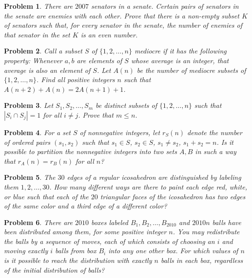 \documentclass[12pt]{article}
\newtheorem{problem}{Problem}
\begin{document}
\begin{problem}
\textbf{\textcolor{red}{\heart}}
There are $2007$ senators in a senate. Certain pairs of senators in the senate are enemies with each other. Prove that there is a non-empty subset $K$ of senators such that, for every senator in the senate, the number of enemies of that senator in the set $K$ is an even number.
\end{problem}

\begin{problem}
Call a subset $S$ of $\{1, 2, \ldots, n\}$ mediocre if it has the following property: Whenever $a, b$ are elements of $S$ whose average is an integer, that average is also an element of $S$. Let $A(n)$ be the number of mediocre subsets of $\{1, 2, \ldots, n\}$. Find all positive integers $n$ such that $A(n + 2) + A(n) = 2A(n + 1) + 1$.
\end{problem}

\begin{problem}
Let $S_1, S_2, \ldots, S_m$ be distinct subsets of $\{1, 2, \ldots, n\}$ such that $|S_i \cap S_j| = 1$ for all $i \neq j$. Prove that $m \leq n$.
\end{problem}

\begin{problem}
\textbf{\textcolor{red}{\heart}}
For a set $S$ of nonnegative integers, let $r_S(n)$ denote the number of ordered pairs $(s_1, s_2)$ such that $s_1 \in S$, $s_2 \in S$, $s_1 \neq s_2$, $s_1 + s_2 = n$. Is it possible to partition the nonnegative integers into two sets $A, B$ in such a way that $r_A(n) = r_B(n)$ for all $n$?
\end{problem}

\begin{problem}
The $30$ edges of a regular icosahedron are distinguished by labeling them $1, 2, \ldots, 30$. How many different ways are there to paint each edge red, white, or blue such that each of the $20$ triangular faces of the icosahedron has two edges of the same color and a third edge of a different color?
\end{problem}

\begin{problem}
There are $2010$ boxes labeled $B_1, B_2, \ldots, B_{2010}$ and $2010n$ balls have been distributed among them, for some positive integer $n$. You may redistribute the balls by a sequence of moves, each of which consists of choosing an $i$ and moving exactly $i$ balls from box $B_i$ into any one other box. For which values of $n$ is it possible to reach the distribution with exactly $n$ balls in each box, regardless of the initial distribution of balls?
\end{problem}
\end{document}
